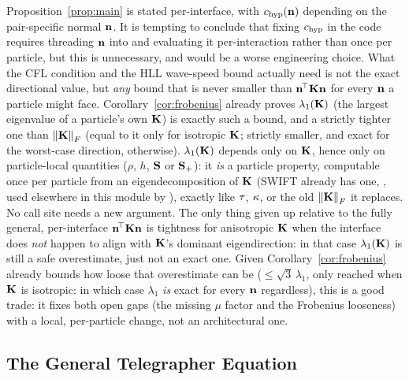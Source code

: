 \begin{remark}
\label{rem:lambda-max-not-n}
Proposition~\ref{prop:main} is stated per-interface, with $c_{\rm hyp}(\mathbf{n})$
depending on the pair-specific normal $\mathbf{n}$. It is tempting to conclude
that fixing $c_{\rm hyp}$ in the code requires threading $\mathbf{n}$ into
 and evaluating it
per-interaction rather than once per particle, but this is unnecessary,
and would be a worse engineering choice. What the CFL condition and the
HLL wave-speed bound actually need is not the exact directional value, but
\emph{any} bound that is never smaller than $\mathbf{n}^{\!\top}\mathbf{K}\mathbf{n}$
for every $\mathbf{n}$ a particle might face. Corollary~\ref{cor:frobenius}
already proves $\lambda_1(\mathbf{K})$ (the largest eigenvalue of a
particle's own $\mathbf{K}$) is exactly such a bound, and a strictly tighter
one than $\norm{\mathbf{K}}_F$ (equal to it only for isotropic $\mathbf{K}$; strictly
smaller, and exact for the worst-case direction, otherwise). $\lambda_1(\mathbf{K})$
depends only on $\mathbf{K}$, hence only on particle-local quantities ($\rho$,
$h$, $\mathbf{S}$ or $\mathbf{S}_{+}$): it \emph{is} a particle property, computable
once per particle from an eigendecomposition of $\mathbf{K}$ (SWIFT already has
one, , used elsewhere in this module
by ), exactly like $\tau$,
$\kappa$, or the old $\norm{\mathbf{K}}_F$ it replaces. No call site needs a
new argument. The only thing given up relative to the fully general,
per-interface $\mathbf{n}^{\!\top}\mathbf{K}\mathbf{n}$ is tightness for anisotropic
$\mathbf{K}$ when the interface does \emph{not} happen to align with $\mathbf{K}$'s
dominant eigendirection: in that case $\lambda_1(\mathbf{K})$ is still a safe
overestimate, just not an exact one. Given Corollary~\ref{cor:frobenius}
already bounds how loose that overestimate can be
($\leq\sqrt3\,\lambda_1$, only reached when $\mathbf{K}$ is isotropic: in
which case $\lambda_1$ \emph{is} exact for every $\mathbf{n}$ regardless), this
is a good trade: it fixes both open gaps (the missing $\mu$ factor and the
Frobenius looseness) with a local, per-particle change, not an
architectural one.
\end{remark}

\subsection{The General Telegrapher Equation}
\label{sec:telegrapher}

